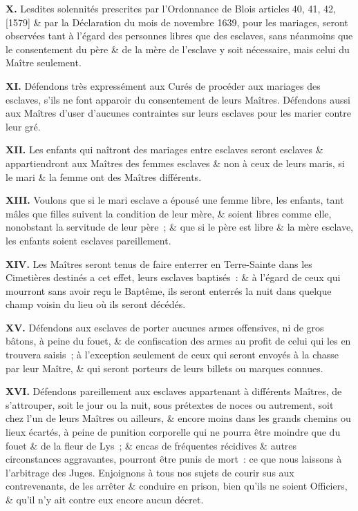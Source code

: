 \documentclass[french,twoside]{book} %
\newcommand{\labelchar}[1]{\textbf{\color{rubric} #1}}
\begin{document}
\labelchar{X.} Lesdites solennités prescrites par l’Ordonnance de Blois articles 40, 41, 42, [1579] \& par la Déclaration du mois de novembre 1639, pour les mariages, seront observées tant à l’égard des personnes libres que des esclaves, sans néanmoins que le consentement du père \& de la mère de l’esclave y soit nécessaire, mais celui du Maître seulement.\par
\labelchar{XI.} Défendons très expressément aux Curés de procéder aux mariages des esclaves, s’ils ne font apparoir du consentement de leurs Maîtres. Défendons aussi aux Maîtres d’user d’aucunes contraintes sur leurs esclaves pour les marier contre leur gré.\par
\labelchar{XII.} Les enfants qui naîtront des mariages entre esclaves seront esclaves \& appartiendront aux Maîtres des femmes esclaves \& non à ceux de leurs maris, si le mari \& la femme ont des Maîtres différents.\par
\labelchar{XIII.} Voulons que si le mari esclave a épousé une femme libre, les enfants, tant mâles que filles suivent la condition de leur mère, \& soient libres comme elle, nonobstant la servitude de leur père ; \& que si le père est libre \& la mère esclave, les enfants soient esclaves pareillement.\par
\labelchar{XIV.} Les Maîtres seront tenus de faire enterrer en Terre-Sainte dans les Cimetières destinés a cet effet, leurs esclaves baptisés : \& à l’égard de ceux qui mourront sans avoir reçu le Baptême, ils seront enterrés la nuit dans quelque champ voisin du lieu où ils seront décédés.\par
\labelchar{XV.} Défendons aux esclaves de porter aucunes armes offensives, ni de gros bâtons, à peine du fouet, \& de confiscation des armes au profit de celui qui les en trouvera saisis ; à l’exception seulement de ceux qui seront envoyés à la chasse par leur Maître, \& qui seront porteurs de leurs billets ou marques connues.\par
\labelchar{XVI.} Défendons pareillement aux esclaves appartenant à différents Maîtres, de s’attrouper, soit le jour ou la nuit, sous prétextes de noces ou autrement, soit chez l’un de leurs Maîtres ou ailleurs, \& encore moins dans les grands chemins ou lieux écartés, à peine de punition corporelle qui ne pourra être moindre que du fouet \& de la fleur de Lys ; \& encas de fréquentes récidives \& autres circonstances aggravantes, pourront être punis de mort : ce que nous laissons à l’arbitrage des Juges. Enjoignons à tous nos sujets de courir sus aux contrevenants, de les arrêter \& conduire en prison, bien qu’ils ne soient Officiers, \& qu’il n’y ait contre eux encore aucun décret.\par
\end{document}
